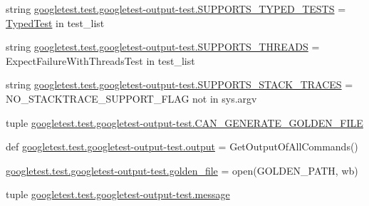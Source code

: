\begin{DoxyCompactItemize}
\item 
string \mbox{\hyperlink{namespacegoogletest_1_1test_1_1googletest-output-test_a986917046593c87504b43f1cb4e18fc8}{googletest.\+test.\+googletest-\/output-\/test.\+S\+U\+P\+P\+O\+R\+T\+S\+\_\+\+T\+Y\+P\+E\+D\+\_\+\+T\+E\+S\+TS}} = \textquotesingle{}\mbox{\hyperlink{class_typed_test}{Typed\+Test}}\textquotesingle{} in test\+\_\+list
\item 
string \mbox{\hyperlink{namespacegoogletest_1_1test_1_1googletest-output-test_a56afd7a24670ca774f8619905e73d1b2}{googletest.\+test.\+googletest-\/output-\/test.\+S\+U\+P\+P\+O\+R\+T\+S\+\_\+\+T\+H\+R\+E\+A\+DS}} = \textquotesingle{}Expect\+Failure\+With\+Threads\+Test\textquotesingle{} in test\+\_\+list
\item 
string \mbox{\hyperlink{namespacegoogletest_1_1test_1_1googletest-output-test_a07d6f9ec7cb3d0bc672ff2e4cbd8eaa2}{googletest.\+test.\+googletest-\/output-\/test.\+S\+U\+P\+P\+O\+R\+T\+S\+\_\+\+S\+T\+A\+C\+K\+\_\+\+T\+R\+A\+C\+ES}} = N\+O\+\_\+\+S\+T\+A\+C\+K\+T\+R\+A\+C\+E\+\_\+\+S\+U\+P\+P\+O\+R\+T\+\_\+\+F\+L\+AG not in sys.\+argv
\item 
tuple \mbox{\hyperlink{namespacegoogletest_1_1test_1_1googletest-output-test_a2307b15f49d2957898d6a67e3af65cbf}{googletest.\+test.\+googletest-\/output-\/test.\+C\+A\+N\+\_\+\+G\+E\+N\+E\+R\+A\+T\+E\+\_\+\+G\+O\+L\+D\+E\+N\+\_\+\+F\+I\+LE}}
\item 
def \mbox{\hyperlink{namespacegoogletest_1_1test_1_1googletest-output-test_a6773c2217ae4694b4db5610620562437}{googletest.\+test.\+googletest-\/output-\/test.\+output}} = Get\+Output\+Of\+All\+Commands()
\item 
\mbox{\hyperlink{namespacegoogletest_1_1test_1_1googletest-output-test_a43fd0a2352f415deb258d9b137ac371b}{googletest.\+test.\+googletest-\/output-\/test.\+golden\+\_\+file}} = open(G\+O\+L\+D\+E\+N\+\_\+\+P\+A\+TH, \textquotesingle{}wb\textquotesingle{})
\item 
tuple \mbox{\hyperlink{namespacegoogletest_1_1test_1_1googletest-output-test_a2ccb426013ff32550cc6a34a73cc9eaf}{googletest.\+test.\+googletest-\/output-\/test.\+message}}
\end{DoxyCompactItemize}
